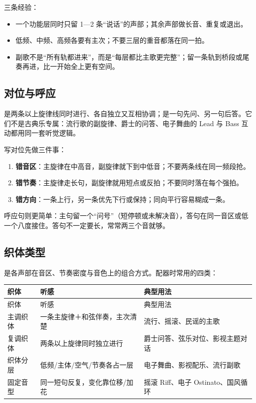 三条经验：

\begin{itemize}
\item 一个功能层同时只留 1—2 条“说话”的声部；其余声部做长音、重复或退出。
\item 低频、中频、高频各要有主次；不要三层的重音都落在同一拍。
\item 副歌不是“所有轨都进来”，而是“每层都比主歌更完整”；留一条轨到桥段或尾奏再进，比一开始全上更有空间。
\end{itemize}

\subsection{对位与呼应}
\label{sec:counterpoint-call}

是两条以上旋律线同时进行、各自独立又互相协调；是一句先问、另一句后答。它们不是古典乐专属：流行歌的副旋律、爵士的问答、电子舞曲的 Lead 与 Bass 互动都用同一套听觉逻辑。

写对位先做三件事：

\begin{enumerate}
\item \textbf{错音区}：主旋律在中高音，副旋律就下到中低音；不要两条线在同一频段抢。
\item \textbf{错节奏}：主旋律走长句，副旋律就用短点或反拍；不要同时落在每个强拍。
\item \textbf{错方向}：一条上行，另一条优先下行或保持；同向平行容易糊成一条。
\end{enumerate}

呼应句则更简单：主句留一个“问号”（短停顿或未解决音），答句在同一音区或低一个八度接住。答句不一定要长，常常两三个音就够。

\subsection{织体类型}
\label{sec:texture-types}

是各声部在音区、节奏密度与音色上的组合方式。配器时常用的四类：

\begin{longtable}{p{}p{}p{}}
\toprule
织体 & 听感 & 典型用法 \\
\midrule
\endfirsthead
\toprule
织体 & 听感 & 典型用法 \\
\midrule
\endhead
主调织体 & 一条主旋律＋和弦伴奏，主次清楚 & 流行、摇滚、民谣的主歌 \\
复调织体 & 两条以上旋律同时独立进行 & 爵士问答、弦乐对位、影视主题对话 \\
织体分层 & 低频/主体/空气/节奏各占一层 & 电子舞曲、影视配乐、流行副歌 \\
固定音型 & 同一短句反复，变化靠位移/加花 & 摇滚 Riff、电子 Ostinato、国风循环 \\
\bottomrule
\end{longtable}

